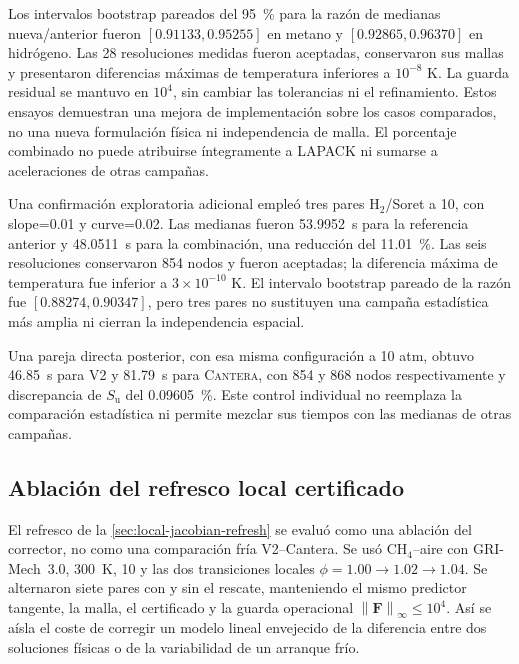 \documentclass[12pt,a4paper,twoside,openany]{book}
\newcommand{\vect}[1]{\bm{#1}}
\newcommand{\norm}[1]{\left\lVert #1\right\rVert}
\newcommand{\Su}{S_{\mathrm{u}}}
\newcommand{\Vdos}{\textsc{V2}\xspace}
\newcommand{\Cantera}{\textsc{Cantera}\xspace}
\begin{document}
Los intervalos bootstrap pareados del \SI{95}{\percent} para la razón de
medianas nueva/anterior fueron \([0.91133,0.95255]\) en metano y
\([0.92865,0.96370]\) en hidrógeno. Las 28 resoluciones medidas fueron
aceptadas, conservaron sus mallas y presentaron diferencias máximas de
temperatura inferiores a \(10^{-8}\) K. La guarda residual se mantuvo en
\(10^4\), sin cambiar las tolerancias ni el refinamiento. Estos ensayos
demuestran una mejora de implementación sobre los casos comparados, no una
nueva formulación física ni independencia de malla. El porcentaje combinado
no puede atribuirse íntegramente a LAPACK ni sumarse a aceleraciones de otras
campañas.

Una confirmación exploratoria adicional empleó tres pares H\(_2\)/Soret a
\SI{10}{\atmosphere}, con slope=0.01 y curve=0.02. Las medianas fueron
\SI{53.9952}{\second} para la referencia anterior y \SI{48.0511}{\second}
para la combinación, una reducción del \SI{11.01}{\percent}. Las seis
resoluciones conservaron 854 nodos y fueron aceptadas; la diferencia máxima
de temperatura fue inferior a \(3\times10^{-10}\) K. El intervalo bootstrap
pareado de la razón fue \([0.88274,0.90347]\), pero tres pares no sustituyen
una campaña estadística más amplia ni cierran la independencia espacial.

Una pareja directa posterior, con esa misma configuración a 10 atm, obtuvo
\SI{46.85}{\second} para \Vdos y \SI{81.79}{\second} para \Cantera,
con 854 y 868 nodos respectivamente y discrepancia de \(\Su\) del
\SI{0.09605}{\percent}. Este control individual no reemplaza la comparación
estadística ni permite mezclar sus tiempos con las medianas de otras campañas.



\subsection{Ablación del refresco local certificado}
\label{sec:local-refresh-ablation}

El refresco de la \cref{sec:local-jacobian-refresh} se evaluó como una ablación
del corrector, no como una comparación fría V2--Cantera. Se usó
CH\(_4\)--aire con GRI-Mech~3.0, \SI{300}{\kelvin}, \SI{10}{\atmosphere} y
las dos transiciones locales \(\phi=1.00\rightarrow1.02\rightarrow1.04\).
Se alternaron siete pares con y sin el rescate, manteniendo el mismo predictor
tangente, la malla, el certificado y la guarda operacional
\(\norm{\vect F}_\infty\le10^4\). Así se aísla el coste de corregir un modelo
lineal envejecido de la diferencia entre dos soluciones físicas o de la
variabilidad de un arranque frío.
\end{document}
